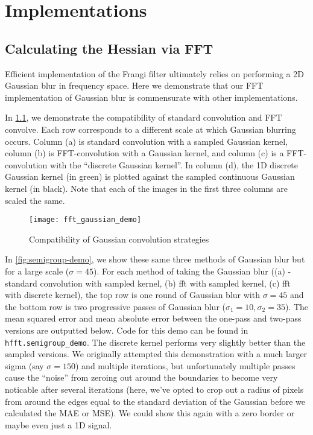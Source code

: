 \chapter{Implementations} \label{ch:implementations}


\section{Calculating the Hessian via FFT}

Efficient implementation of the Frangi filter ultimately relies on performing a 2D Gaussian blur in frequency space. Here we demonstrate that our FFT implementation of Gaussian blur is commensurate with other implementations. 

In \cref{fig:fft-gaussian-demo}, we demonstrate the compatibility of standard convolution and FFT convolve. Each row corresponds to a different scale at which Gaussian blurring  occurs. Column (a) is standard convolution with a sampled Gaussian kernel, column (b) is FFT-convolution with a Gaussian kernel, and column (c) is a FFT-convolution with the ``discrete Gaussian kernel''. In column (d), the 1D discrete Gaussian kernel (in green) is plotted against the sampled continuous Gaussian kernel (in black). Note that each of the images in the first three columns are scaled the same.
\begin{figure}
  \texttt{[image: fft\_gaussian\_demo]}
  \caption{Compatibility of Gaussian convolution strategies}
  \label{fig:fft-gaussian-demo}
\end{figure}

In \cref{fig:semigroup-demo}, we show these same three methods of Gaussian blur but for a large scale
($\sigma=45$). For each method of taking the Gaussian blur ((a) - standard convolution with sampled kernel, (b) fft with sampled kernel, (c) fft with discrete kernel), the top row is one round of Gaussian blur with $\sigma=45$ and the bottom row is two progressive passes of Gaussian blur ($\sigma_1 = 10, \sigma_2 = 35$). The mean squared error and mean absolute error between the one-pass and two-pass versions are outputted below. Code for this demo can be found in \texttt{hfft.semigroup\_demo}.
The discrete kernel performs very slightly better than the sampled versions. We originally attempted
this demonstration with a much larger sigma (say $\sigma=150$) and multiple iterations, but unfortunately multiple passes cause the ``noise'' from zeroing out around the boundaries to become very noticable after several iterations (here, we've opted to crop out a radius of pixels from around the edges equal to the standard deviation of the Gaussian before we calculated the MAE or MSE). We could show this again with a zero border or maybe even just a 1D signal.

